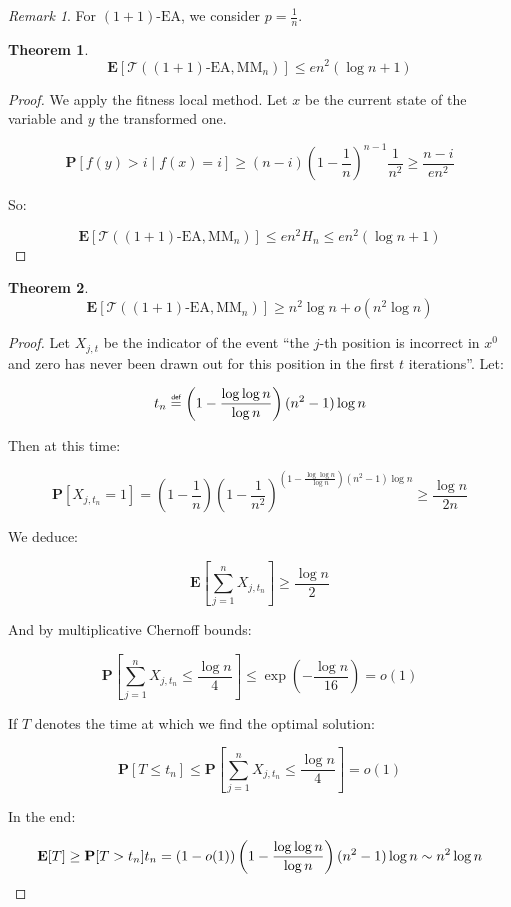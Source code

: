 \documentclass[12pt]{article}
\theoremstyle{definition}
\theoremstyle{plain}
\newtheorem*{theorem}{Theorem}
\theoremstyle{remark}
\newtheorem*{remark}{Remark}
\newcommand\mydef{\mathrel{\overset{\makebox[0pt]{\mbox{\normalfont\tiny\sffamily def}}}{=}}}
\begin{document}
\begin{remark}
    For $(1+1)\text{-EA}$, we consider $p=\frac{1}{n}$.
\end{remark}

\begin{theorem}
    $$\mathbf{E}[\mathcal{T}((1+1)\text{-EA},\text{MM}_n)]\le e n^2 (\log n+1)$$
\end{theorem}

\begin{proof}
    We apply the fitness local method. Let $x$ be the current state of the variable and $y$ the transformed one. 

    $$\mathbf{P}[f(y)>i\mid f(x)=i]\ge (n-i)\left(1-\frac{1}{n}\right)^{n-1} \frac{1}{n^2}\ge \frac{n-i}{e n^2}$$

    So:

    $$\mathbf{E}[\mathcal{T}((1+1)\text{-EA},\text{MM}_n)]\le e n^2 H_n\le e n^2(\log n+1)$$\qedhere
\end{proof}

\begin{theorem}
    $$\mathbf{E}[\mathcal{T}((1+1)\text{-EA},\text{MM}_n)]\ge n^2 \log n+o(n^2\log n)$$
\end{theorem}

\begin{proof}
    Let $X_{j,t}$ be the indicator of the event ``the $j$-th position is incorrect in $x^0$ and zero has
    never been drawn out for this position in the first $t$ iterations''. Let:

    $$t_n\mydef \left(1-\frac{\log \log n}{\log n}\right)(n^2-1)\log n$$

    Then at this time:

    $$\mathbf{P}[X_{j,t_n}=1]=
    \left(1-\frac{1}{n}\right)\left(1-\frac{1}{n^2}\right)^{\left(1-\frac{\log\log n}{\log n}\right)(n^2-1)\log n}\ge \frac{\log n}{2n}
    $$

    We deduce:

    $$\mathbf{E}\left[\sum_{j=1}^n X_{j,t_n}\right] \ge \frac{\log n}{2}$$

    And by multiplicative Chernoff bounds:

    $$\mathbf{P}\left[\sum_{j=1}^n X_{j,t_n}\le \frac{\log n}{4}\right] \le \exp\left(-\frac{\log n}{16}\right)=o(1)$$

    If $T$ denotes the time at which we find the optimal solution:

    $$\mathbf{P}[T\le t_n]\le \mathbf{P}\left[\sum_{j=1}^n X_{j,t_n} \le \frac{\log n}{4}\right]=o(1)$$

    In the end:

    $$\mathbf{E}[T]\ge \mathbf{P}[T>t_n] t_n=(1-o(1))\left(1-\frac{\log \log n}{\log n}\right)(n^2-1)\log n\sim n^2\log n\qedhere$$
\end{proof}
\end{document}
